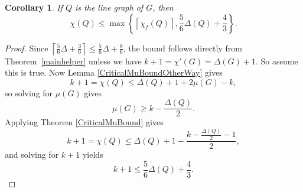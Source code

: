 \documentclass[12pt]{amsart}
\theoremstyle{plain}
\newtheorem{cor}[thm]{Corollary}
\theoremstyle{definition}
\theoremstyle{remark}
\newcommand{\set}[1]{\left\{ #1 \right\}}
\newcommand{\ceil}[1]{\left\lceil#1\right\rceil}
\begin{document}

\begin{cor}
If $Q$ is the line graph of $G$, then
\[\chi(Q) \le \max\set{\ceil{\chi_f(Q)}, \frac56\Delta(Q)+ \frac43}.\]
\label{mainCor}
\end{cor}
\begin{proof}
Since $\ceil{\frac56\Delta+\frac36}\le\frac56\Delta+\frac86$, the bound follows
directly from Theorem~\ref{mainhelper} unless we have $k +1=\chi'(G)=
\Delta(G)+1$.  So assume this is true.
Now Lemma \ref{CriticalMuBoundOtherWay} gives
\[k + 1 = \chi(Q) \le \Delta(Q) + 1 + 2\mu(G) - k,\]
so solving for $\mu(G)$ gives
\[\mu(G) \ge k - \frac{\Delta(Q)}{2}.\]
Applying Theorem \ref{CriticalMuBound} gives
\[k+1 = \chi(Q) \le \Delta(Q) + 1 - \frac{k - \frac{\Delta(Q)}{2} - 1}{2},\]
and solving for $k+1$ yields
\[k+1 \le \frac56\Delta(Q) + \frac43.\]
\end{proof}

\newpage
\end{document}
